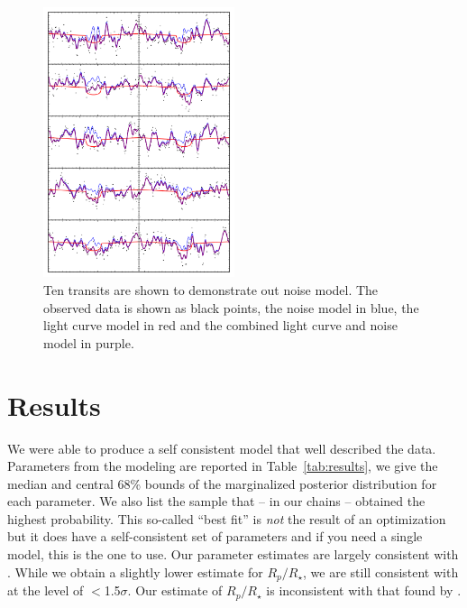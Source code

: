 \documentclass[apjl]{emulateapj}
\begin{document}
\begin{figure}
\includegraphics[width=0.50\textwidth]{ten_transits.png}
\caption{Ten transits are shown to demonstrate out noise model. The observed data is shown as black points, the noise model in blue, the light curve model in red and the combined light curve and noise model in purple.}
\label{fig:filter}
\end{figure}


\section{Results}
We were able to produce a self consistent model that well described the data. Parameters from the modeling are reported in Table~\ref{tab:results}, we give the median and central 68\% bounds of the marginalized posterior distribution for each parameter. We also list the sample that -- in our chains -- obtained the highest probability. This so-called ``best fit'' is \emph{not} the result of an optimization but it does have a self-consistent set of parameters and if you need a single model, this is the one to use. Our parameter estimates are largely consistent with \citet{lillo14}. While we obtain a slightly lower estimate for $R_{p}/R_{\star}$, we are still consistent with \citet{lillo14} at the level of $<$1.5$\sigma$. Our estimate of $R_{p}/R_{\star}$ is inconsistent with that found by \citet{sliski14}.
\end{document}
